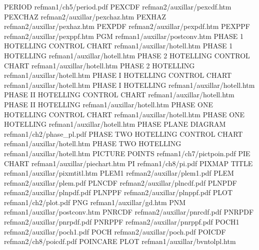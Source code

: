 PERIOD                                  refman1/ch5/period.pdf
PEXCDF                                  refman2/auxillar/pexcdf.htm
PEXCHAZ                                 refman2/auxillar/pexchaz.htm
PEXHAZ                                  refman2/auxillar/pexhaz.htm
PEXPDF                                  refman2/auxillar/pexpdf.htm
PEXPPF                                  refman2/auxillar/pexppf.htm
PGM                                     refman1/auxillar/postconv.htm
PHASE 1 HOTELLING CONTROL CHART         refman1/auxillar/hotell.htm
PHASE 1 HOTELLING                       refman1/auxillar/hotell.htm
PHASE 2 HOTELLING CONTROL CHART         refman1/auxillar/hotell.htm
PHASE 2 HOTELLING                       refman1/auxillar/hotell.htm
PHASE I HOTELLING CONTROL CHART         refman1/auxillar/hotell.htm
PHASE I HOTELLING                       refman1/auxillar/hotell.htm
PHASE II HOTELLING CONTROL CHART        refman1/auxillar/hotell.htm
PHASE II HOTELLING                      refman1/auxillar/hotell.htm
PHASE ONE HOTELLING CONTROL CHART       refman1/auxillar/hotell.htm
PHASE ONE HOTELLING                     refman1/auxillar/hotell.htm
PHASE PLANE DIAGRAM                     refman1/ch2/phase_pl.pdf
PHASE TWO HOTELLING CONTROL CHART       refman1/auxillar/hotell.htm
PHASE TWO HOTELLING                     refman1/auxillar/hotell.htm
PICTURE POINTS                          refman1/ch7/pictpoin.pdf
PIE CHART                               refman1/auxillar/piechart.htm
PI                                      refman1/ch8/pi.pdf
PIXMAP TITLE                            refman1/auxillar/pixmtitl.htm
PLEM1                                   refman2/auxillar/plem1.pdf
PLEM                                    refman2/auxillar/plem.pdf
PLNCDF                                  refman2/auxillar/plncdf.pdf
PLNPDF                                  refman2/auxillar/plnpdf.pdf
PLNPPF                                  refman2/auxillar/plnppf.pdf
PLOT                                    refman1/ch2/plot.pdf
PNG                                     refman1/auxillar/gd.htm
PNM                                     refman1/auxillar/postconv.htm
PNRCDF                                  refman2/auxillar/pnrcdf.pdf
PNRPDF                                  refman2/auxillar/pnrpdf.pdf
PNRPPF                                  refman2/auxillar/pnrppf.pdf
POCH1                                   refman2/auxillar/poch1.pdf
POCH                                    refman2/auxillar/poch.pdf
POICDF                                  refman2/ch8/poicdf.pdf
POINCARE PLOT                           refman1/auxillar/bvntolpl.htm
